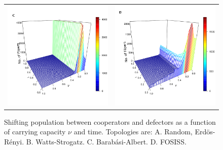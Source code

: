 \documentclass[11pt]{article}
\begin{document}
\begin{figure} [h!]
\begin{tabular}{cc}
\includegraphics[scale=0.28]{images/barabasi_state_nus.png} & \includegraphics[scale=0.28]{images/fosiss_state_nus.png}
\end{tabular}
\caption{Shifting population between cooperators and defectors as a function of
  carrying capacity $\nu$ and time. Topologies are: A. Random, Erd\"{o}s-R\'enyi. B. Watts-Strogatz. C. Barab\'asi-Albert. D. FOSISS.}\label{state} 
\end{figure}
\end{document}
